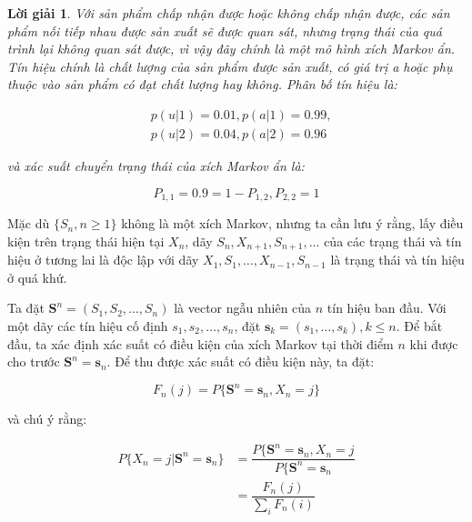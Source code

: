 \documentclass[14pt, a4paper]{article}
\numberwithin{equation}{section}
\numberwithin{figure}{section}
\theoremstyle{sltheorem}
\theoremstyle{soltheorem}
\newtheorem*{loigiai}{Lời giải}
\numberwithin{dl}{section}
\numberwithin{md}{section}
\numberwithin{vd}{section}
\begin{document}
    \begin{loigiai}
        Với sản phẩm chấp nhận được hoặc không chấp nhận được, các sản phẩm nối tiếp nhau được sản xuất sẽ được quan sát, nhưng trạng thái của quá trình lại không quan sát được,
        vì vậy đây chính là một mô hình xích Markov ẩn.
        Tín hiệu chính là chất lượng của sản phẩm được sản xuất, có giá trị a hoặc phụ thuộc vào sản phẩm có đạt chất lượng hay không.
        Phân bố tín hiệu là:

        \begin{equation*}
            \begin{aligned}
                &p(u \vert 1) = 0.01, p(a \vert 1)=0.99, \\ &p(u \vert 2) = 0.04, p(a \vert 2) = 0.96
            \end{aligned}
        \end{equation*}

        và xác suất chuyển trạng thái của xích Markov ẩn là:

        \begin{equation*}
            P_{1, 1} = 0.9 = 1- P_{1, 2}, P_{2, 2} = 1
        \end{equation*}
    \end{loigiai}

    Mặc dù $\lbrace S_n, n \geq 1 \rbrace$ không là một xích Markov, nhưng ta cần lưu ý rằng, lấy điều kiện trên trạng thái hiện tại $X_n$, dãy $S_n, X_{n+1}, S_{n+1}, \dots$ của các trạng thái và tín hiệu ở tương lai là độc lập với dãy $X_1, S_1, \dots, X_{n-1}, S_{n-1}$ là trạng thái và tín hiệu ở quá khứ.

    Ta đặt $\mathbf{S}^n=(S_1, S_2, \dots, S_n)$ là vector ngẫu nhiên của $n$ tín hiệu ban đầu.
    Với một dãy các tín hiệu cố định $s_1, s_2, \dots, s_n$, đặt $\mathbf{s}_k = (s_1, \dots, s_k), k \leq n$.
    Để bắt đầu, ta xác định xác suất có điều kiện của xích Markov tại thời điểm $n$ khi được cho trước $\mathbf{S}^n=\mathbf{s}_n$.
    Để thu được xác suất có điều kiện này, ta đặt:

    \begin{equation*}
        F_n(j) = P \lbrace \mathbf{S}^n = \mathbf{s}_n, X_n = j \rbrace
    \end{equation*}

    và chú ý rằng:

    \begin{equation*}
        \begin{aligned}
            P \lbrace X_n = j \vert \mathbf{S}^n = \mathbf{s}_n \rbrace &= \dfrac{P \lbrace \mathbf{S}^n = \mathbf{s}_n, X_n = j}{P \lbrace \mathbf{S}^n = \mathbf{s}_n} \\
            &= \dfrac{F_n(j)}{\sum_i F_n(i)}
        \end{aligned}    
    \end{equation*}
\end{document}
